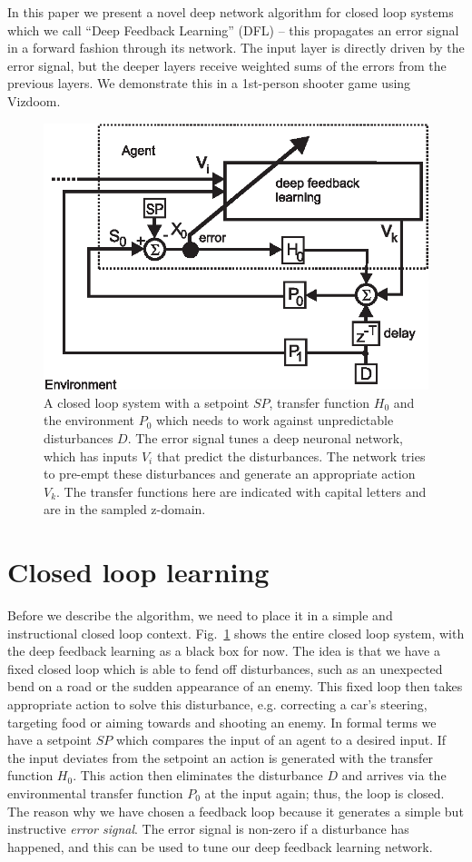 \documentclass{article}
\begin{document}
In this paper we present a novel deep network algorithm for closed
loop systems which we call ``Deep Feedback Learning'' (DFL) -- this
propagates an error signal in a forward fashion through its
network. The input layer is directly driven by the error signal, but the
deeper layers receive weighted sums of the errors from the previous
layers.  We demonstrate this in a 1st-person shooter game using
Vizdoom.

\begin{figure}[!ht]
  \centering
  \includegraphics[width=0.75\columnwidth]{closed_loop}
  \caption{A closed loop system with a setpoint $SP$, transfer
    function $H_0$ and the environment $P_0$ which needs to work
    against unpredictable disturbances $D$.  The error signal tunes a
    deep neuronal network, which has inputs $V_i$ that predict the
    disturbances. The network tries to pre-empt these disturbances and
    generate an appropriate action $V_k$. The transfer functions here
    are indicated with capital letters and are in the sampled
    z-domain.
    \label{closed_loop}}
\end{figure}

\section{Closed loop learning}
Before we describe the algorithm, we need to place it in a simple and
instructional closed loop context. Fig.~\ref{closed_loop} shows the
entire closed loop system, with the deep feedback learning as a black
box for now. The idea is that we have a fixed closed loop which is
able to fend off disturbances, such as an unexpected bend on a road or
the sudden appearance of an enemy. This fixed loop then takes
appropriate action to solve this disturbance, e.g. correcting a car's
steering, targeting food or aiming towards and shooting an enemy. In
formal terms we have a setpoint $SP$ which compares the input of an
agent to a desired input. If the input deviates from the setpoint an
action is generated with the transfer function $H_0$. This action then
eliminates the disturbance $D$ and arrives via the environmental
transfer function $P_0$ at the input again; thus, the loop is
closed. The reason why we have chosen a feedback loop because it
generates a simple but instructive \textsl{error signal}. The error
signal is non-zero if a disturbance has happened, and this can be used
to tune our deep feedback learning network.
\end{document}
